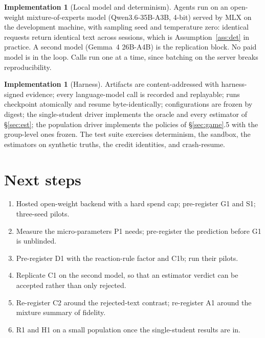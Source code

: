 \documentclass[11pt]{article}
\numberwithin{theorem}{section}
\theoremstyle{definition}
\newtheorem{implementation}[theorem]{Implementation}
\theoremstyle{problemstyle}
\begin{document}
\begin{implementation}[Local model and determinism]
Agents run on an open-weight mixture-of-experts model (Qwen3.6-35B-A3B, 4-bit) served by MLX on the development
machine, with sampling seed and temperature zero: identical requests return identical text across sessions, which is
Assumption~\ref{ass:det} in practice. A second model (Gemma~4 26B-A4B) is the replication block. No paid model is in
the loop. Calls run one at a time, since batching on the server breaks reproducibility.
\end{implementation}

\begin{implementation}[Harness]
Artifacts are content-addressed with harness-signed evidence; every language-model call is recorded and replayable;
runs checkpoint atomically and resume byte-identically; configurations are frozen by digest; the single-student driver
implements the oracle and every estimator of \S\ref{sec:est}; the population driver implements the policies of \S\ref{sec:game}.5
with the group-level ones frozen. The test suite exercises determinism, the sandbox, the estimators on synthetic truths,
the credit identities, and crash-resume.
\end{implementation}

\section{Next steps}
\begin{enumerate}
\item Hosted open-weight backend with a hard spend cap; pre-register G1 and S1; three-seed pilots.
\item Measure the micro-parameters P1 needs; pre-register the prediction before G1 is unblinded.
\item Pre-register D1 with the reaction-rule factor and C1b; run their pilots.
\item Replicate C1 on the second model, so that an estimator verdict can be accepted rather than only rejected.
\item Re-register C2 around the rejected-text contrast; re-register A1 around the mixture summary of fidelity.
\item R1 and H1 on a small population once the single-student results are in.
\end{enumerate}

\appendix
\end{document}
